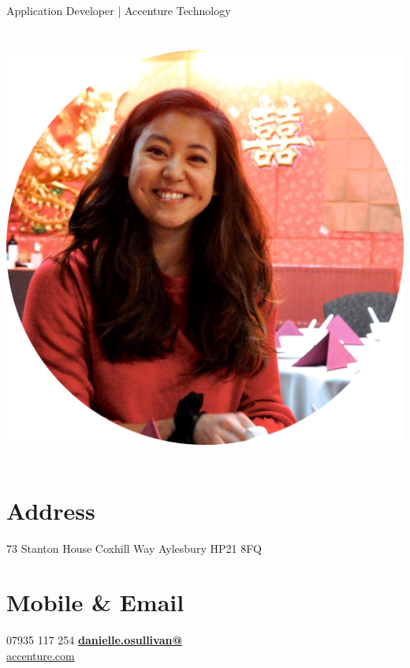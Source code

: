 \documentclass[]{friggeri-cv}
\begin{document}
      {\-\hspace{1.5cm} Application Developer | Accenture Technology}
      

\begin{aside}
  \section{}
    {\includegraphics[scale=0.1]{img/circledp.png}}
    ~
	\section{Address}
		73 Stanton House
		Coxhill Way
		Aylesbury
		HP21 8FQ
		~
  \section{Mobile \& Email}
    07935 117 254
    \href{mailto:danielle.osullivan@accenture.com}{\textbf{danielle.osullivan@}\\accenture.com}
    ~

\end{aside}
\end{document}
